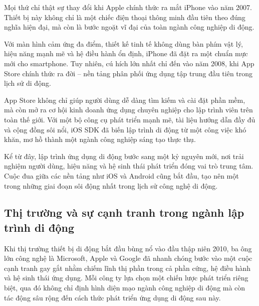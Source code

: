   
  
  \hspace*{0.8cm}Mọi thứ chỉ thật sự thay đổi khi Apple chính thức ra mắt iPhone vào năm 2007. Thiết bị này không chỉ là một chiếc điện thoại thông minh đầu tiên theo đúng nghĩa hiện đại, mà còn là bước ngoặt vĩ đại của toàn ngành công nghiệp di động.
  
  \vspace{0.5em}
  
  \hspace*{0.8cm}Với màn hình cảm ứng đa điểm, thiết kế tinh tế không dùng bàn phím vật lý, hiệu năng mạnh mẽ và hệ điều hành ổn định, iPhone đã đặt ra một chuẩn mực mới cho smartphone. Tuy nhiên, cú hích lớn nhất chỉ đến vào năm 2008, khi App Store chính thức ra đời – nền tảng phân phối ứng dụng tập trung đầu tiên trong lịch sử di động.
  
  \vspace{0.5em}
  
  \hspace*{0.8cm}App Store không chỉ giúp người dùng dễ dàng tìm kiếm và cài đặt phần mềm, mà còn mở ra cơ hội kinh doanh ứng dụng chuyên nghiệp cho lập trình viên trên toàn thế giới. Với một bộ công cụ phát triển mạnh mẽ, tài liệu hướng dẫn đầy đủ và cộng đồng sôi nổi, iOS SDK đã biến lập trình di động từ một công việc khó khăn, mơ hồ thành một ngành công nghiệp sáng tạo thực thụ.
  
  \vspace{0.5em}
  
  \hspace*{0.8cm}Kể từ đây, lập trình ứng dụng di động bước sang một kỷ nguyên mới, nơi trải nghiệm người dùng, hiệu năng và hệ sinh thái phát triển đóng vai trò trung tâm. Cuộc đua giữa các nền tảng như iOS và Android cũng bắt đầu, tạo nên một trong những giai đoạn sôi động nhất trong lịch sử công nghệ di động.
  

\subsection{Thị trường và sự cạnh tranh trong ngành lập trình di động}
\renewcommand{\labelitemi}{--}    
    
        \hspace*{0.8cm}Khi thị trường thiết bị di động bắt đầu bùng nổ vào đầu thập niên 2010, ba ông lớn công nghệ là Microsoft, Apple và Google đã nhanh chóng bước vào một cuộc cạnh tranh gay gắt nhằm chiếm lĩnh thị phần trong cả phần cứng, hệ điều hành và hệ sinh thái ứng dụng. Mỗi công ty lựa chọn một chiến lược phát triển riêng biệt, qua đó không chỉ định hình diện mạo ngành công nghiệp di động mà còn tác động sâu rộng đến cách thức phát triển ứng dụng di động sau này.
    
